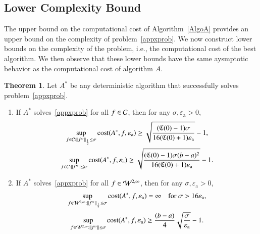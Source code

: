 \documentclass[review]{elsarticle}
\newcommand{\abstol}{\varepsilon_{\textrm{a}}}
\theoremstyle{definition}
\newtheorem{theorem}{Theorem}
\begin{document}
\subsection{Lower Complexity Bound} \label{subsec:appxcomp}

The upper bound on the computational cost of Algorithm~\ref{AlgoA} provides an upper bound on the complexity of problem~\eqref{appxprob}.  We now construct lower bounds on the complexity of the problem, i.e., the computational cost of the best algorithm.  We then observe that these lower bounds have the same aysmptotic behavior as the computational cost of algorithm $A$.

\begin{theorem}
	Let $A^*$ be any deterministic algorithm that successfully solves problem~\eqref{appxprob}.
	
	\begin{enumerate}
		\renewcommand{\labelenumi}{\roman{enumi}.}
		\item  If $A^*$ solves~\eqref{appxprob} for all $f \in \mathcal{C}$, then for any $\sigma, \abstol >0$,
		\begin{subequations} \label{lowbdC}
		\begin{gather}
		\sup_{f \in \cc : \norm[\frac12]{f''} \le\sigma } \cost(A^*,f,\abstol) \ge \sqrt{\frac{(\fC(0)-1)\sigma}{16(\fC(0)+1)\abstol}} -1, \label{lowbdChalf}\\
		\sup_{f \in \cc : \norm{f''} \le\sigma } \cost(A^*,f,\abstol) \ge \sqrt{\frac{(\fC(0)-1)\sigma(b-a)^2}{16(\fC(0)+1)\abstol}} -1 \label{lowbdCinf}.
		\end{gather}
		\end{subequations}
		
		\item If $A^*$ solves~\eqref{appxprob} for all $f \in  \mathcal{W}^{2,\infty}$, then for any $\sigma, \abstol >0$,
		\begin{subequations} \label{lowbdW}
		\begin{gather}
		\sup_{f \in \cw^{2,\infty} : \norm[\frac12]{f''} \le \sigma} \cost(A^*,f,\abstol) = \infty \quad \text{for } \sigma > 16 \abstol, \label{lowbdWhalf}\\
		\sup_{f \in \cw^{2,\infty} : \norm{f''} \le\sigma } \cost(A^*,f,\abstol) \ge \frac{(b-a)}{4} \sqrt{\frac{\sigma}{\abstol}} - 1.  \label{lowbdWinf}
		\end{gather}
		\end{subequations}
				
	\end{enumerate}
	\label{thm:A_cost}
\end{theorem}
\end{document}

